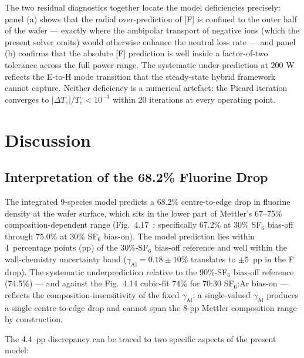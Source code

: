 \documentclass[11pt,a4paper]{report}
\begin{document}
The two residual diagnostics together locate the model deficiencies precisely: panel (a) shows that the radial over-prediction of [F] is confined to the outer half of the wafer --- exactly where the ambipolar transport of negative ions (which the present solver omits) would otherwise enhance the neutral loss rate --- and panel (b) confirms that the absolute [F] prediction is well inside a factor-of-two tolerance across the full power range.  The systematic under-prediction at 200 W reflects the E-to-H mode transition that the steady-state hybrid framework cannot capture.  Neither deficiency is a numerical artefact: the Picard iteration converges to $|\Delta T_e|/T_e < 10^{-3}$ within 20 iterations at every operating point.


\section{Discussion}
\label{sec:discussion}

\subsection{Interpretation of the 68.2\% Fluorine Drop}

The integrated 9-species model predicts a 68.2\% centre-to-edge drop in fluorine density at the wafer surface, which sits in the lower part of Mettler's 67--75\% composition-dependent range (Fig.~4.17~\cite{Mettler2025}; specifically 67.2\% at 30\% SF$_6$ bias-off through 75.0\% at 30\% SF$_6$ bias-on).  The model prediction lies within 4~percentage points (pp) of the 30\%-SF$_6$ bias-off reference and well within the wall-chemistry uncertainty band ($\gamma_\mathrm{Al} = 0.18 \pm 10\%$ translates to $\pm 5$~pp in the F drop).  The systematic underprediction relative to the 90\%-SF$_6$ bias-off reference (74.5\%) --- and against the Fig.~4.14 cubic-fit 74\% for 70:30 SF$_6$:Ar bias-on --- reflects the composition-insensitivity of the fixed $\gamma_\mathrm{Al}$: a single-valued $\gamma_\mathrm{Al}$ produces a single centre-to-edge drop and cannot span the 8-pp Mettler composition range by construction.

The 4.4~pp discrepancy can be traced to two specific aspects of the present model:
\end{document}
